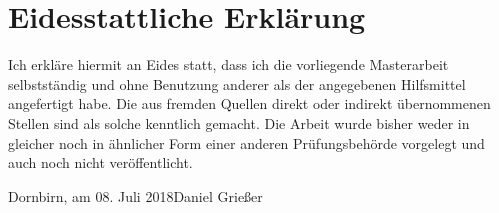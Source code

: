 \documentclass[a4paper,12pt,twoside]{scrreprt}
\begin{document}










\clearpage
{}
\printbibliography{}



\chapter*{Eidesstattliche Erklärung}
Ich erkläre hiermit an Eides statt, dass ich die vorliegende Masterarbeit selbstständig und ohne Benutzung anderer als der angegebenen Hilfsmittel angefertigt habe. Die aus fremden Quellen direkt oder indirekt übernommenen Stellen sind als solche kenntlich gemacht. Die Arbeit wurde bisher weder in gleicher noch in ähnlicher Form einer anderen Prüfungsbehörde vorgelegt und auch noch nicht veröffentlicht.

\vspace{3cm}
\noindent
Dornbirn, am 08. Juli 2018\hfill Daniel Grießer
\end{document}
